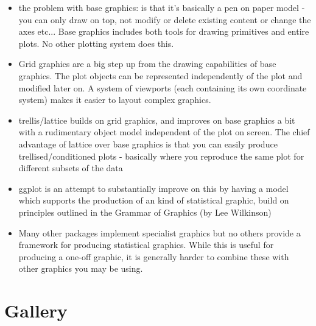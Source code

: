 \begin{itemize} 
	\item the problem with base graphics: is that it's basically a pen on paper model - you can only draw on top, not modify or delete existing content or change the axes etc... Base graphics includes both tools for drawing primitives and entire plots. No other plotting system does this.

	\item Grid graphics are a big step up from the drawing capabilities of base graphics. The plot objects can be represented independently of the plot and modified later on. A system of viewports (each containing its own coordinate system) makes it easier to layout complex graphics.

	\item trellis/lattice builds on grid graphics, and improves on base graphics a bit with a rudimentary object model independent of the plot on screen. The chief advantage of lattice over base graphics is that you can easily produce trellised/conditioned plots - basically where you reproduce the same plot for different subsets of the data

	\item ggplot is an attempt to substantially improve on this by having a model which supports the production of an kind of statistical graphic, build on principles outlined in the Grammar of Graphics (by Lee Wilkinson)

	\item Many other packages implement specialist graphics but no others provide a framework for producing statistical graphics. While this is useful for producing a one-off graphic, it is generally harder to combine these with other graphics you may be using.

\end{itemize}

\section{Gallery}


